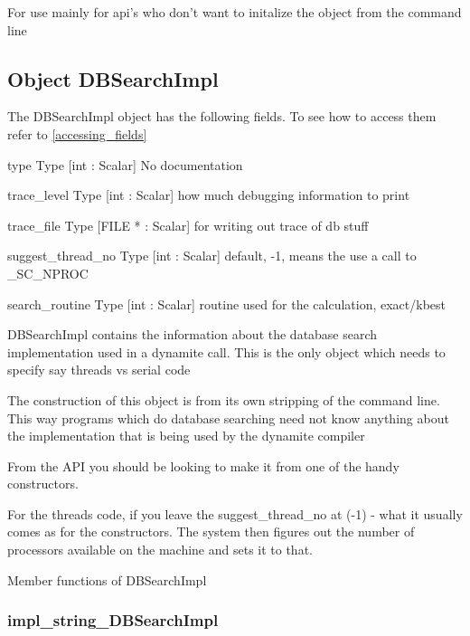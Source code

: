 For use mainly for api's who don't want
to initalize the object from the command
line




\subsection{Object DBSearchImpl}

\label{object_DBSearchImpl}

The DBSearchImpl object has the following fields. To see how to access them refer to \ref{accessing_fields}
\begin{description}
\item{type} Type [int : Scalar] No documentation

\item{trace_level} Type [int : Scalar]  how much debugging information to print

\item{trace_file} Type [FILE * : Scalar]  for writing out trace of db stuff

\item{suggest_thread_no} Type [int : Scalar]  default, -1, means the use a call to _SC_NPROC

\item{search_routine} Type [int : Scalar]  routine used for the calculation, exact/kbest

\end{description}


DBSearchImpl contains the information about
the database search implementation used in
a dynamite call. This is the only object which
needs to specify say threads vs serial code


The construction of this object is from its own
stripping of the command line. This way programs
which do database searching need not know anything
about the implementation that is being used by 
the dynamite compiler


From the API you should be looking to make it from
one of the handy constructors.


For the threads code, if you leave the suggest_thread_no
at (-1) - what it usually comes as for the constructors.
The system then figures out the number of processors available
on the machine and sets it to that.




Member functions of DBSearchImpl

\subsubsection{impl_string_DBSearchImpl}

